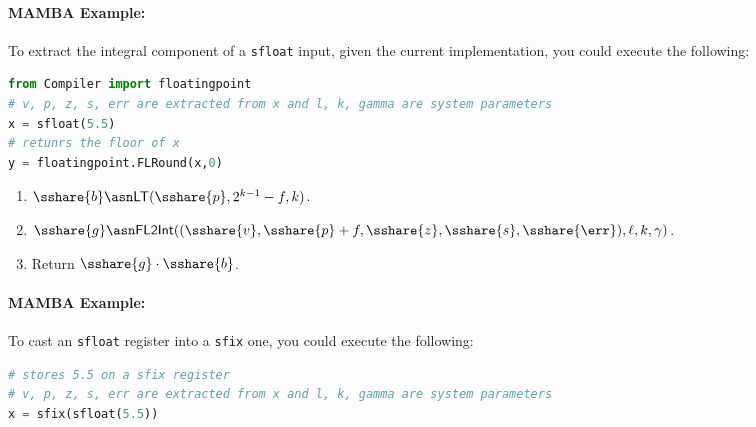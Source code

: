     \paragraph{MAMBA Example:} To extract the integral component of a \verb|sfloat| input,
    given the current implementation, you could execute the following:
    \begin{lstlisting}[language={python}]
from Compiler import floatingpoint
# v, p, z, s, err are extracted from x and l, k, gamma are system parameters
x = sfloat(5.5)
# retunrs the floor of x
y = floatingpoint.FLRound(x,0)
\end{lstlisting}
  \fi

\begin{enumerate}
  \item $\sshare{b} \asn \mathsf{LT}(\sshare{p},2^{k-1}-f,k)$.
  \item $\sshare{g} \asn \mathsf{FL2Int}((\sshare{v},\sshare{p}+f,\sshare{z},
          \sshare{s},\sshare{\err}),\ell,k,\gamma)$.
  \item Return $\sshare{g} \cdot \sshare{b}$.
\end{enumerate}
\paragraph{MAMBA Example:} To cast an \verb|sfloat| register into a \verb|sfix| one, you could execute the following:
\begin{lstlisting}[language={python}]
# stores 5.5 on a sfix register
# v, p, z, s, err are extracted from x and l, k, gamma are system parameters
x = sfix(sfloat(5.5))
\end{lstlisting}

